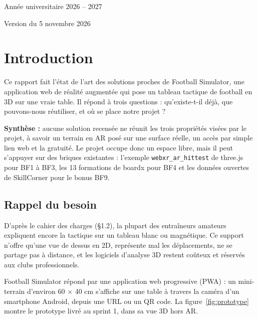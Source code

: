 \documentclass[11pt,a4paper]{article}
\newcommand{\code}[1]{\texttt{#1}}
\begin{document}
\begin{titlepage}
  \vspace{1.4cm}
  {Année universitaire 2026 -- 2027\par}
  \vspace{2pt}
  {\small\color{gris} Version du 5 novembre 2026\par}
\end{titlepage}

\tableofcontents
\newpage

\section{Introduction}

Ce rapport fait l'état de l'art des solutions proches de Football Simulator, une application web de réalité augmentée qui pose un tableau tactique de football en 3D sur une vraie table. Il répond à trois questions : qu'existe-t-il déjà, que pouvons-nous réutiliser, et où se place notre projet ?

\begin{encadre}
\textbf{Synthèse :} aucune solution recensée ne réunit les trois propriétés visées par le projet, à savoir un terrain en AR posé sur une surface réelle, un accès par simple lien web et la gratuité. Le projet occupe donc un espace libre, mais il peut s'appuyer sur des briques existantes : l'exemple \code{webxr\_ar\_hittest} de three.js pour BF1 à BF3, les 13 formations de boardx pour BF4 et les données ouvertes de SkillCorner pour le bonus BF9.
\end{encadre}

\subsection{Rappel du besoin}

D'après le cahier des charges (§1.2), la plupart des entraîneurs amateurs expliquent encore la tactique sur un tableau blanc ou magnétique. Ce support n'offre qu'une vue de dessus en 2D, représente mal les déplacements, ne se partage pas à distance, et les logiciels d'analyse 3D restent coûteux et réservés aux clubs professionnels.

Football Simulator répond par une application web progressive (PWA) : un mini-terrain d'environ 60 × 40 cm s'affiche sur une table à travers la caméra d'un smartphone Android, depuis une URL ou un QR code. La figure~\ref{fig:prototype} montre le prototype livré au sprint 1, dans sa vue 3D hors AR.
\end{document}
